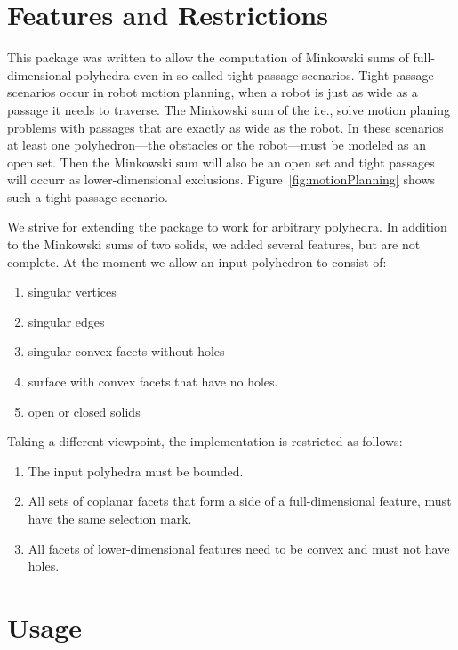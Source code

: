 \section{Features and Restrictions}
\label{sec:restrictions}

This package was written to allow the computation of Minkowski sums of
full-dimensional polyhedra even in so-called tight-passage scenarios.
Tight passage scenarios occur in robot motion planning, when a robot
is just as wide as a passage it needs to traverse. The Minkowski sum
of the i.e., solve motion planing problems with passages that are
exactly as wide as the robot. In these scenarios at least one
polyhedron---the obstacles or the robot---must be modeled as an open
set. Then the Minkowski sum will also be an open set and tight
passages will occurr as lower-dimensional
exclusions. Figure~\ref{fig:motionPlanning} shows such a tight
passage scenario.

We strive for extending the package to work for arbitrary
polyhedra. In addition to the Minkowski sums of two solids, we added
several features, but are not complete. At the moment we allow an
input polyhedron to consist of:
\begin{enumerate}
\item singular vertices
\item singular edges
\item singular convex facets without holes
\item surface with convex facets that have no holes.
\item open or closed solids
\end{enumerate}

Taking a different viewpoint, the implementation is restricted as
follows:
\begin{enumerate}
\item The input polyhedra must be bounded.
\item All sets of coplanar facets that form a side of a full-dimensional
feature, must have the same selection mark.
\item All facets of lower-dimensional features need to be convex and 
must not have holes.
\end{enumerate}

\section{Usage}

